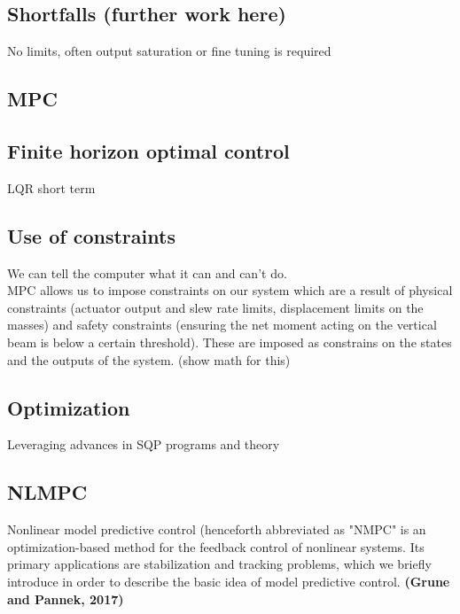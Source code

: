 \documentclass{UoNMCHA}
\numberwithin{equation}{section}
\begin{document}
	\subsection*{Shortfalls (further work here)}
	
	No limits, often output saturation or fine tuning is required
	
	\subsection{MPC}
	
	\subsection*{Finite horizon optimal control}
	LQR short term
	
	\subsection*{Use of constraints}
	
	We can tell the computer what it can and can’t do.  \\
	
	MPC allows us to impose constraints on our system which are a result of physical constraints (actuator output and slew rate limits, displacement limits on the masses) and safety constraints (ensuring the net moment acting on the vertical beam is below a certain threshold). These are imposed as constrains on the states and the outputs of the system. (show math for this) 
	
	\subsection*{Optimization}
	
	Leveraging advances in SQP programs and theory 
	
	\subsection*{NLMPC}
	
	Nonlinear model predictive control (henceforth abbreviated as "NMPC"  is an optimization-based method for the feedback control of nonlinear systems. Its primary applications are stabilization and tracking problems, which we briefly introduce in order to describe the basic idea of model predictive control. \textbf{(Grune and Pannek, 2017)} \\
	
\end{document}
